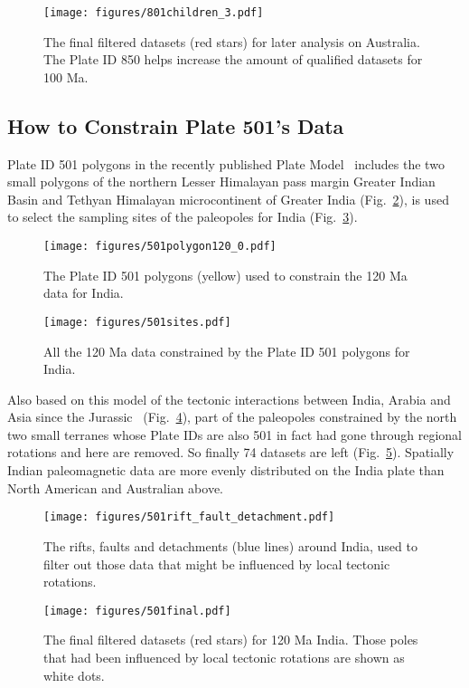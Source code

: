 \begin{figure}
\texttt{[image: figures/801children\_3.pdf]}
\caption{The final filtered datasets (red stars) for later analysis on
Australia. The Plate ID 850 helps increase the amount of qualified datasets for
100 Ma.}\label{fig_AUfinal}
\end{figure}

\subsection{How to Constrain Plate 501's Data}
Plate ID 501 polygons in the recently published Plate Model~\cite{Y18} includes
the two small polygons of the northern Lesser Himalayan pass margin Greater
Indian Basin and Tethyan Himalayan microcontinent of Greater India
(Fig.~\ref{fig_INpolygon}), is used to select the sampling
sites of the paleopoles for India (Fig.~\ref{fig_INpmdata}).

\begin{figure}
\texttt{[image: figures/501polygon120\_0.pdf]}
\caption{The Plate ID 501 polygons (yellow) used to constrain the
120 Ma data for India.}\label{fig_INpolygon}
\end{figure}

\begin{figure}
\texttt{[image: figures/501sites.pdf]}
\caption{All the 120 Ma data constrained by the Plate ID 501
polygons for India.}\label{fig_INpmdata}
\end{figure}

Also based on this model of the tectonic interactions between India, Arabia and
Asia since the Jurassic~\cite{G15} (Fig.~\ref{fig_INrfd}), part of the
paleopoles constrained by the north two small terranes whose Plate IDs are also
501 in fact had gone through regional rotations and here are removed. So finally
74 datasets are left (Fig.~\ref{fig_INfinal}). Spatially Indian paleomagnetic
data are more evenly distributed on the India plate than North American and
Australian above.

\begin{figure}
\texttt{[image: figures/501rift\_fault\_detachment.pdf]}
\caption{The rifts, faults and detachments (blue lines) around India, used to
filter out those data that might be influenced by local tectonic
rotations.}\label{fig_INrfd}
\end{figure}

\begin{figure}
\texttt{[image: figures/501final.pdf]}
\caption{The final filtered datasets (red stars) for 120 Ma India.
Those poles that had been influenced by local tectonic rotations are shown as
white dots.}\label{fig_INfinal}
\end{figure}

